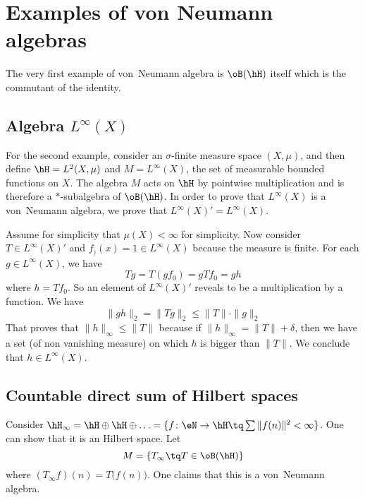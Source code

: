 \section{Examples of von Neumann algebras}

The very first example of von~Neumann algebra is $\oB(\hH)$ itself which is the commutant of the identity.

\subsection{Algebra \texorpdfstring{$L^{\infty}(X)$}{LX}}


 For the second example, consider an $\sigma$-finite measure space $(X,\mu)$, and then define $\hH=L^2(X,\mu)$ and $M=L^{\infty}(X)$, the set of measurable bounded functions on $X$. The algebra $M$ acts on $\hH$ by pointwise multiplication and is therefore a $*$-subalgebra of $\oB(\hH)$. In order to prove that $ L^{\infty}(X)$ is a von~Neumann algebra, we prove that $ L^{\infty}(X)'= L^{\infty}(X)$.

Assume for simplicity that $\mu(X)<\infty$ for simplicity. Now consider $T\in L^{\infty}(X)'$ and $f_)(x)=1\in L^{\infty}(X)$ because the measure is finite. For each $g\in L^{\infty}(X)$, we have
\[ 
  Tg=T(gf_0)=gTf_0=gh
\]
where $h=Tf_0$. So an element of $ L^{\infty}(X)'$ reveals to be a multiplication by a function. We have
\[ 
  \| gh \|_2=\| Tg \|_2\leq \| T \|\cdot \| g \|_2
\]
That proves that $\| h \|_{\infty}\leq \| T \|$ because if $\| h \|_{\infty}=\| T \|+\delta$, then we have a set (of non vanishing measure) on which $h$ is bigger than $\| T \|$. We conclude that $h\in L^{\infty}(X)$.

\subsection{Countable direct sum of Hilbert spaces}

Consider $\hH_{\infty}=\hH\oplus\hH\oplus\ldots=\{ f\colon \eN\to \hH\tq \sum \| f(n) \|^2<\infty \}$. One can show that it is an Hilbert space. Let
\[ 
  M=\{ T_{\infty}\tq T\in\oB(\hH) \}
\]
where $(T_{\infty}f)(n)=T\big( f(n) \big)$. One claims that this is a von~Neumann algebra.

